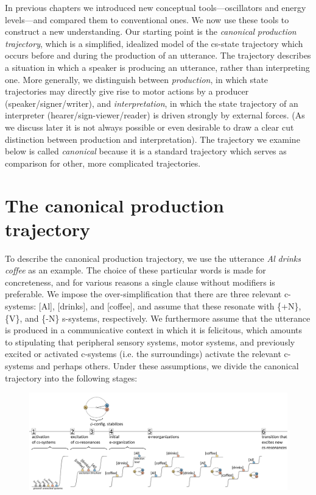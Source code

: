 In previous chapters we introduced new conceptual tools—oscillators and energy levels—and compared them to conventional ones. We now use these tools to construct a new understanding. Our starting point is the \textit{canonical} \textit{production} \textit{trajectory}, which is a simplified, idealized model of the cs-state trajectory which occurs before and during the production of an utterance. The trajectory describes a situation in which a speaker is producing an utterance, rather than interpreting one. More generally, we distinguish between \textit{production}, in which state trajectories may directly give rise to motor actions by a producer (speaker/signer/writer), and \textit{interpretation}, in which the state trajectory of an interpreter (hearer/sign-viewer/reader) is driven strongly by external forces. (As we discuss later it is not always possible or even desirable to draw a clear cut distinction between production and interpretation). The trajectory we examine below is called \textit{canonical} because it is a standard trajectory which serves as comparison for other, more complicated trajectories.

\section{The canonical production trajectory}

To describe the canonical production trajectory, we use the utterance \textit{Al} \textit{drinks} \textit{coffee} as an example. The choice of these particular words is made for concreteness, and for various reasons a single clause without modifiers is preferable. We impose the over-simplification that there are three relevant c-systems: [Al], [drinks], and [coffee], and assume that these resonate with \{+N\}, \{V\}, and \{-N\} s-systems, respectively. We furthermore assume that the utterance is produced in a communicative context in which it is felicitous, which amounts to stipulating that peripheral sensory systems, motor systems, and previously excited or activated c-systems (i.e. the surroundings) activate the relevant c-systems and perhaps others. Under these assumptions, we divide the canonical trajectory into the following stages:

  
\begin{figure}
\includegraphics[width=\textwidth]{figures/Tilsen-img51.png}
\caption{\missingcaption}
\label{fig:}
\end{figure}
 

